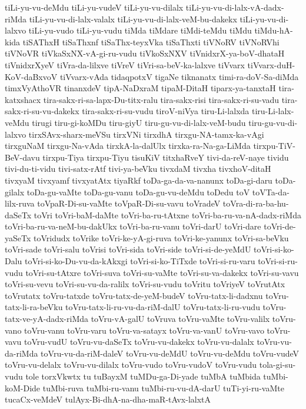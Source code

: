 {tiLi-yu-vu-deMdu
tiLi-yu-vudeV
tiLi-yu-vu-dilalx
tiLi-yu-vu-di-lalx-vA-dadx-riMda
tiLi-yu-vu-di-lalx-valalx
tiLi-yu-vu-di-lalx-veM-bu-dakekx
tiLi-yu-vu-di-lalxvo
tiLi-yu-vudo
tiLi-yu-vudu
tiMda
tiMdare
tiMdi-teMdu
tiMdu
tiMdu-hA-kida
tiSAThxH
tiSaThxnf
tiSaThx-teyxVka
tiSaThxti
tiVNoRV
tiVNoRVhi
tiVNoVR
tiVkaSxNX-vA-gi-ru-vudu
tiVkoSxNXV
tiVnidxrX-ya-boV-dhataH
tiVnidxrXyeV
tiVra-da-lilxve
tiVreV
tiVri-sa-beV-ka-lalxve
tiVvarx
tiVvarx-duH-KoV-daBxvoV
tiVvarx-vAda
tidaqpotxV
tigaNe
tiknanatx
timi-ra-doV-Sa-diMda
timxVyAthoVR
tinanxdeV
tipA-NaDxraM
tipaM-DitaH
tiparx-ya-tanxtaH
tira-katxshacx
tira-sakx-ri-sa-lapx-Du-titx-ralu
tira-sakx-risi
tira-sakx-ri-su-vadu
tira-sakx-ri-su-vu-dakekx
tira-sakx-ri-su-vudu
tiroV-niVya
tiru-Li-lalxda
tiru-Li-lalx-veMdu
tirugi
tiru-gi-koMDu
tiru-giyU
tiru-gu-vu-di-lalx-veM-budu
tiru-gu-vu-di-lalxvo
tirxSAvx-sharx-meVSu
tirxVNi
tirxdhA
tirxgu-NA-tamx-ka-vAgi
tirxguNaM
tirxgu-Na-vAda
tirxkA-la-dalUlx
tirxka-ra-Na-ga-LiMda
tirxpu-TiV-BeV-davu
tirxpu-Tiya
tirxpu-Tiyu
tisuKiV
titxhaRveY
tivi-da-reV-naye
tividu
tivi-du-ti-vidu
tivi-satx-rAtf
tivi-ya-beVku
tivxdaM
tivxha
tivxhoV-ditaH
tivxyaM
tivxyamf
tivxyatAtx
tiyaRkf
toDa-ga-da-va-nanunx
toDa-gi-daru
toDa-gilalx
toDa-gu-vaMte
toDa-gu-vanu
toDa-gu-vu-deMdu
toDedu
toV
toVTa-da-lilx-ruva
toVpaR-Di-su-vaMte
toVpaR-Di-su-vavu
toVradeV
toVra-di-ra-ba-hu-daSeTx
toVri
toVri-baM-daMte
toVri-ba-ru-tAtxne
toVri-ba-ru-va-nA-dadx-riMda
toVri-ba-ru-va-neM-bu-dakUkx
toVri-ba-ru-vanu
toVri-darU
toVri-dare
toVri-de-yaSeTx
toVridudx
toVrike
toVri-ke-yA-gi-ruva
toVri-ke-yanunx
toVri-sa-beVku
toVri-sade
toVri-salu
toVrisi
toVri-sida
toVri-side
toVri-si-de-yeMdU
toVri-si-ko-Dalu
toVri-si-ko-Du-vu-da-kAkxgi
toVri-si-ko-TiTxde
toVri-si-ru-varu
toVri-si-ru-vudu
toVri-su-tAtxre
toVri-suva
toVri-su-vaMte
toVri-su-va-dakekx
toVri-su-vavu
toVri-su-vevu
toVri-su-vu-da-ralilx
toVri-su-vudu
toVritu
toVriyeV
toVrutAtx
toVrutatx
toVru-tatxde
toVru-tatx-de-yeM-budeV
toVru-tatx-li-dadxnu
toVru-tatx-li-ra-beVku
toVru-tatx-li-ru-vu-da-riM-dalU
toVru-tatx-li-ru-vudu
toVru-tatx-ve-yA-dadx-riMda
toVru-vA-galU
toVruva
toVru-vaMte
toVru-valilx
toVru-vano
toVru-vanu
toVru-varu
toVru-va-satayx
toVru-va-vanU
toVru-vavo
toVru-vavu
toVru-vudU
toVru-vu-daSeTx
toVru-vu-dakekx
toVru-vu-dalalx
toVru-vu-da-riMda
toVru-vu-da-riM-daleV
toVru-vu-deMdU
toVru-vu-deMdu
toVru-vudeV
toVru-vu-delalx
toVru-vu-dilalx
toVru-vudo
toVru-vudoV
toVru-vudu
tola-gi-su-vudu
tole
torxVkwtx
tu
tuBayxM
tuMDu-ga-Di-yade
tuMbA
tuMbida
tuMbi-koM-Dide
tuMbi-ruva
tuMbi-ru-vanu
tuMbi-ru-vu-dA-darU
tuTi-yi-ru-vaMte
tucaCx-veMdeV
tulAyx-Bi-dhA-na-dha-maR-tAvx-lalxtA
}
